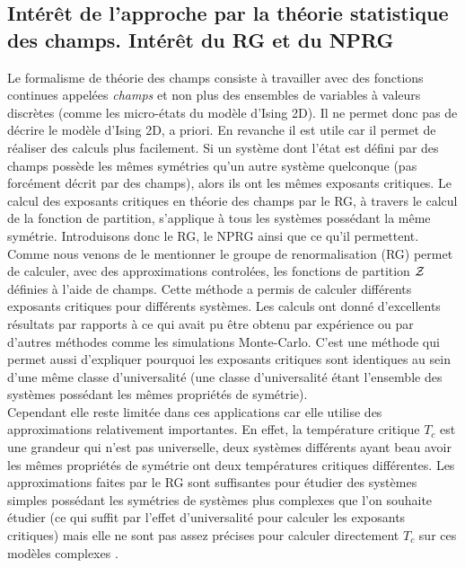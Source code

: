 \documentclass[10.5pt]{article}
\begin{document}
\begin{multicols*}{2}
\subsection{Intérêt de l'approche par la théorie statistique des champs. Intérêt du RG et du NPRG}


Le formalisme de théorie des champs consiste à travailler avec des fonctions continues appelées \textit{champs} et non plus des ensembles de variables à valeurs discrètes (comme les micro-états du modèle d'Ising 2D). Il ne permet donc pas de décrire le modèle d'Ising 2D, a priori. En revanche il est utile car il permet de réaliser des calculs plus facilement. Si un système dont l'état est défini par des champs possède les mêmes symétries qu'un autre système quelconque (pas forcément décrit par des champs), alors ils ont les mêmes exposants critiques. Le calcul des exposants critiques en théorie des champs par le RG, à travers le calcul de la fonction de partition, s'applique à tous les systèmes possédant la même symétrie. Introduisons donc le RG, le NPRG ainsi que ce qu'il permettent. \\

Comme nous venons de le mentionner le groupe de renormalisation (RG) permet de calculer, avec des approximations controlées, les fonctions de partition $\mathcal{Z}$ définies à l'aide de champs. Cette méthode a permis de calculer différents exposants critiques pour différents systèmes. Les calculs ont donné d'excellents résultats \cite{kadanoff1967scaling, wilson1971renormalization2} par rapports à ce qui avait pu être obtenu par expérience ou par d'autres méthodes comme les simulations Monte-Carlo. C'est une méthode qui permet aussi d'expliquer pourquoi les exposants critiques sont identiques au sein d'une même classe d'universalité (une classe d'universalité étant l'ensemble des systèmes possédant les mêmes propriétés de symétrie). \\
\indent
Cependant elle reste limitée dans ces applications car elle utilise des approximations relativement importantes. En effet, la température critique $T_c$ est une grandeur qui n'est pas universelle, deux systèmes différents ayant beau avoir les mêmes propriétés de symétrie ont deux températures critiques différentes. Les approximations faites par le RG sont suffisantes pour étudier des systèmes simples possédant les symétries de systèmes plus complexes que l'on souhaite étudier (ce qui suffit par l'effet d'universalité pour calculer les exposants critiques) mais elle ne sont pas assez précises pour calculer directement $T_c$ sur ces modèles complexes .\\


\end{multicols*}
\end{document}
